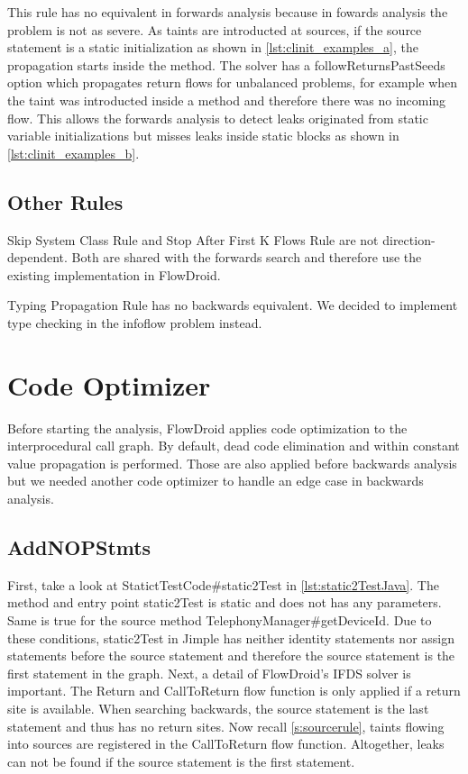 \documentclass[../draft.tex]{subfiles}
\begin{document}
    This rule has no equivalent in forwards analysis because in fowards analysis the problem is not as severe. As taints are introducted at sources, if the source statement is a static initialization as shown in \autoref{lst:clinit_examples_a}, the propagation starts inside the  method. The solver has a followReturnsPastSeeds option which propagates return flows for unbalanced problems, for example when the taint was introducted inside a method and therefore there was no incoming flow. This allows the forwards analysis to detect leaks originated from static variable initializations but misses leaks inside static blocks as shown in \autoref{lst:clinit_examples_b}.

    \subsection{Other Rules}
    Skip System Class Rule and Stop After First K Flows Rule are not direction-dependent. Both are shared with the forwards search and therefore use the existing implementation in FlowDroid.
    
    Typing Propagation Rule has no backwards equivalent. We decided to implement type checking in the infoflow problem instead.



    \section{Code Optimizer}
    Before starting the analysis, FlowDroid applies code optimization to the interprocedural call graph. By default, dead code elimination and within constant value propagation is performed. Those are also applied before backwards analysis but we needed another code optimizer to handle an edge case in backwards analysis.

    \subsection{AddNOPStmts}
    First, take a look at StatictTestCode\#static2Test in \autoref{lst:static2TestJava}. The method and entry point static2Test is static and does not has any parameters. Same is true for the source method TelephonyManager\#getDeviceId. Due to these conditions, static2Test in Jimple has neither identity statements nor assign statements before the source statement and therefore the source statement is the first statement in the graph. 
    Next, a detail of FlowDroid's IFDS solver is important. The Return and CallToReturn flow function is only applied if a return site is available. When searching backwards, the source statement is the last statement and thus has no return sites. Now recall \autoref{s:sourcerule}, taints flowing into sources are registered in the CallToReturn flow function. Altogether, leaks can not be found if the source statement is the first statement.
\end{document}
